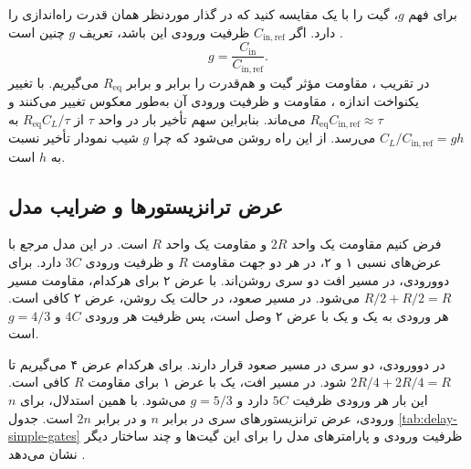 برای فهم \(g\)، گیت را با یک  مقایسه کنید که در
گذار موردنظر همان قدرت راه‌اندازی را دارد. اگر \(C_{\mathrm{in,ref}}\)
ظرفیت ورودی این  باشد، تعریف \(g\) چنین است
\cite[بخش ، صفحه ۱۵۶]{weste}
\cite[اسلاید ۶]{logicaleffortslides}.
\begin{equation}
  g=\frac{C_{\mathrm{in}}}{C_{\mathrm{in,ref}}}.
  \label{eq:delay-gate-logical-effort}
\end{equation}
در تقریب ، مقاومت مؤثر گیت و  هم‌قدرت را
برابر و برابر \(R_{\mathrm{eq}}\) می‌گیریم. با تغییر یکنواخت اندازه
، مقاومت و ظرفیت ورودی آن به‌طور معکوس تغییر
می‌کنند و \(R_{\mathrm{eq}}C_{\mathrm{in,ref}}\approx\tau\)
می‌ماند. بنابراین سهم تأخیر بار در واحد \(\tau\) از
\(R_{\mathrm{eq}}C_L/\tau\) به
\(C_L/C_{\mathrm{in,ref}}=gh\) می‌رسد. از این راه روشن می‌شود
که چرا \(g\) شیب نمودار تأخیر نسبت به \(h\) است.

\subsection{عرض ترانزیستورها و ضرایب مدل}
\label{sec:delay-logical-effort-sizing}

فرض کنیم مقاومت یک  واحد \(2R\) و مقاومت یک
 واحد \(R\) است. در این مدل  مرجع
با عرض‌های نسبی ۱ و ۲، در هر دو جهت مقاومت \(R\) و ظرفیت
ورودی \(3C\) دارد. برای  دوورودی، در مسیر افت دو
 سری روشن‌اند. با عرض ۲ برای هرکدام، مقاومت مسیر
\(R/2+R/2=R\) می‌شود. در مسیر صعود، در حالت یک
 روشن، عرض ۲ کافی است. هر ورودی به یک
 و یک  با عرض ۲ وصل است، پس ظرفیت
هر ورودی \(4C\) و \(g=4/3\) است.

در  دوورودی، دو  سری در مسیر صعود
قرار دارند. برای هرکدام عرض ۴ می‌گیریم تا
\(2R/4+2R/4=R\) شود. در مسیر افت، یک  با عرض ۱
برای مقاومت \(R\) کافی است. این بار هر ورودی ظرفیت \(5C\)
دارد و \(g=5/3\) می‌شود. با همین استدلال، برای \(n\) ورودی،
عرض ترانزیستورهای سری در  برابر \(n\) و در
 برابر \(2n\) است. جدول \ref{tab:delay-simple-gates}
ظرفیت ورودی و پارامترهای مدل را برای این گیت‌ها و چند ساختار دیگر نشان می‌دهد
\cite[شکل  و جدول‌های 
و ، صفحات ۱۵۶ و ۱۵۷]{weste}
\cite[اسلایدهای ۶ تا ۹]{logicaleffortslides}.

